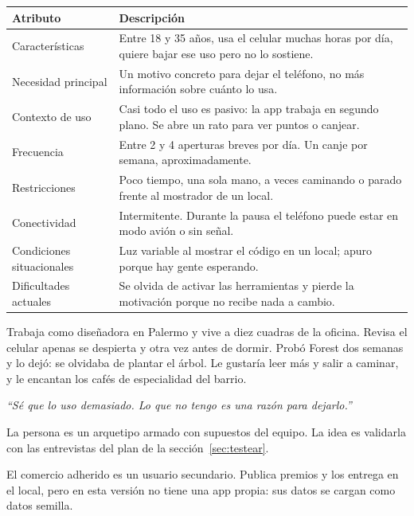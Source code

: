\begin{table}[H]
\centering\small
\begin{tabularx}{\textwidth}{@{}l L@{}}
\toprule
\textbf{Atributo} & \textbf{Descripción} \\
\midrule
Características & Entre 18 y 35 años, usa el celular muchas horas por día, quiere bajar ese uso pero no lo sostiene. \\
Necesidad principal & Un motivo concreto para dejar el teléfono, no más información sobre cuánto lo usa. \\
Contexto de uso & Casi todo el uso es pasivo: la app trabaja en segundo plano. Se abre un rato para ver puntos o canjear. \\
Frecuencia & Entre 2 y 4 aperturas breves por día. Un canje por semana, aproximadamente. \\
Restricciones & Poco tiempo, una sola mano, a veces caminando o parado frente al mostrador de un local. \\
Conectividad & Intermitente. Durante la pausa el teléfono puede estar en modo avión o sin señal. \\
Condiciones situacionales & Luz variable al mostrar el código en un local; apuro porque hay gente esperando. \\
Dificultades actuales & Se olvida de activar las herramientas y pierde la motivación porque no recibe nada a cambio. \\
\bottomrule
\end{tabularx}
\end{table}

\begin{nota}[title={Persona: Martina, 27 años},coltitle=white,colbacktitle=verde,fonttitle=\bfseries]
Trabaja como diseñadora en Palermo y vive a diez cuadras de la oficina. Revisa el celular apenas se despierta y otra vez antes de dormir. Probó Forest dos semanas y lo dejó: se olvidaba de plantar el árbol. Le gustaría leer más y salir a caminar, y le encantan los cafés de especialidad del barrio.

\textit{“Sé que lo uso demasiado. Lo que no tengo es una razón para dejarlo.”}
\end{nota}

La persona es un arquetipo armado con supuestos del equipo. La idea es validarla con las entrevistas del plan de la sección~\ref{sec:testear}.

El comercio adherido es un usuario secundario. Publica premios y los entrega en el local, pero en esta versión no tiene una app propia: sus datos se cargan como datos semilla.

